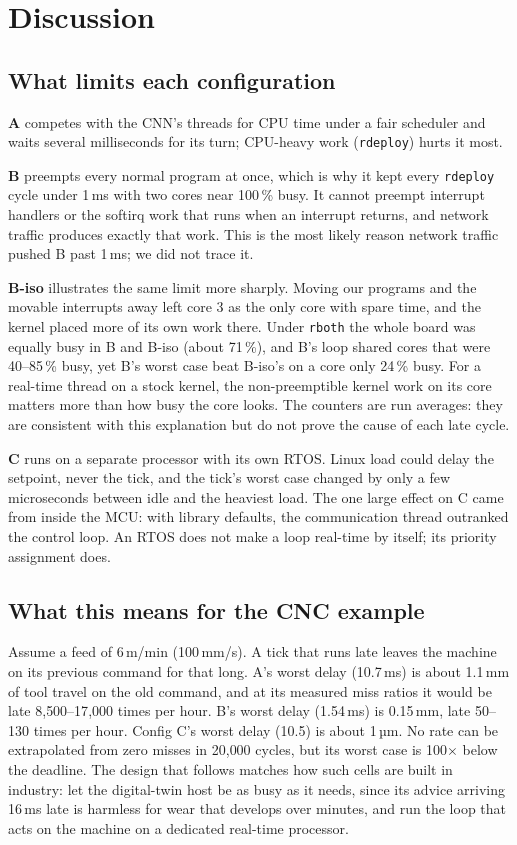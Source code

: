 \section{Discussion}
\label{sec:discussion}

\subsection{What limits each configuration}
\textbf{A} competes with the CNN's threads for CPU time under a fair scheduler and waits several milliseconds for its turn; CPU-heavy work (\texttt{rdeploy}) hurts it most.

\textbf{B} preempts every normal program at once, which is why it kept every \texttt{rdeploy} cycle under 1\,ms with two cores near 100\,\% busy. It cannot preempt interrupt handlers or the softirq work that runs when an interrupt returns, and network traffic produces exactly that work. This is the most likely reason network traffic pushed B past 1\,ms; we did not trace it.

\textbf{B-iso} illustrates the same limit more sharply. Moving our programs and the movable interrupts away left core 3 as the only core with spare time, and the kernel placed more of its own work there. Under \texttt{rboth} the whole board was equally busy in B and B-iso (about 71\,\%), and B's loop shared cores that were 40--85\,\% busy, yet B's worst case beat B-iso's on a core only 24\,\% busy. For a real-time thread on a stock kernel, the non-preemptible kernel work on its core matters more than how busy the core looks. The counters are run averages: they are consistent with this explanation but do not prove the cause of each late cycle.

\textbf{C} runs on a separate processor with its own RTOS. Linux load could delay the setpoint, never the tick, and the tick's worst case changed by only a few microseconds between idle and the heaviest load. The one large effect on C came from inside the MCU: with library defaults, the communication thread outranked the control loop. An RTOS does not make a loop real-time by itself; its priority assignment does.

\subsection{What this means for the CNC example}
Assume a feed of 6\,m/min (100\,mm/s). A tick that runs late leaves the machine on its previous command for that long. A's worst delay (10.7\,ms) is about 1.1\,mm of tool travel on the old command, and at its measured miss ratios it would be late 8{,}500--17{,}000 times per hour. B's worst delay (1.54\,ms) is 0.15\,mm, late 50--130 times per hour. Config C's worst delay (10.5\us) is about 1\,µm. No rate can be extrapolated from zero misses in 20{,}000 cycles, but its worst case is 100$\times$ below the deadline. The design that follows matches how such cells are built in industry: let the digital-twin host be as busy as it needs, since its advice arriving 16\,ms late is harmless for wear that develops over minutes, and run the loop that acts on the machine on a dedicated real-time processor.
